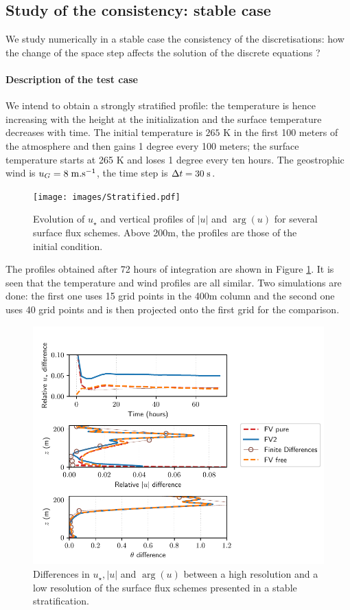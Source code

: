 \subsection{Study of the consistency: stable case}
We study numerically in a stable case the consistency of the
discretisations: how the change of the space step affects the
solution of the discrete equations ?
\paragraph{Description of the test case}
We intend to obtain a strongly stratified profile: the temperature
is hence increasing with the height at the initialization and
the surface temperature decreases with time.
The initial temperature is $265$ K in the first 100 meters of the
atmosphere and then gains 1 degree every 100 meters;
the surface temperature starts at 265 K and loses
1 degree every ten hours.
The geostrophic wind is $u_G = 8 \;{\rm m}.{\rm s}^{-1}$,
the time step is $\Delta t = 30 \;{\rm s}$.
\begin{figure}
	\centering
\texttt{[image: images/Stratified.pdf]}
	\caption{ Evolution of $u_\star$ and
		vertical profiles of $|u|$ and $\arg(u)$ for
		several surface flux schemes. Above 200m,
		the profiles are those of the initial condition.
	}
	\label{fig:ND_Consistency_Stratified}
\end{figure}
The profiles obtained after 72 hours of integration are
shown in Figure \ref{fig:ND_Consistency_Stratified}.
It is seen that the temperature and wind profiles are
all similar.
Two simulations are done: the first one uses 15 grid points
in the 400m column and the second one uses 40 grid points and is then
projected onto the first grid for the comparison.
\begin{figure}
	\centering
\includegraphics[scale=0.6]{images/consistency_comparisonStratified.pdf}
	\caption{Differences in $u_\star, |u|$ and $\arg(u)$
	between a high resolution and a low resolution
	of the surface flux schemes presented in a stable
	stratification.
	}
	\label{fig:ND_Consistency_comparisonStratified}
\end{figure}
